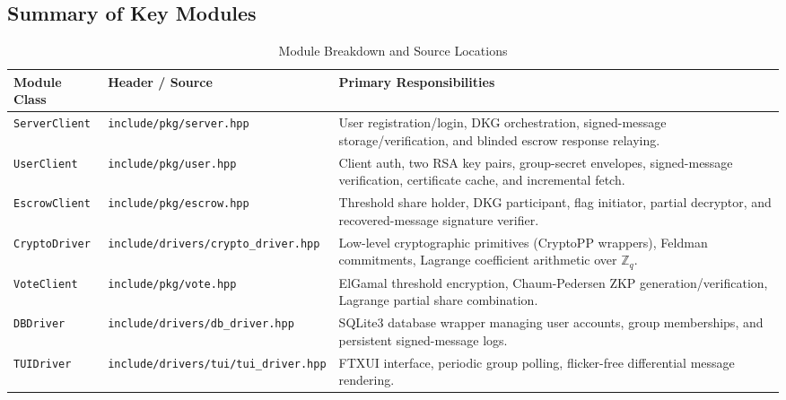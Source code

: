 \documentclass[11pt,a4paper]{article}
\begin{document}
\subsection{Summary of Key Modules}
\begin{table}[H]
	\centering
	\small
	\renewcommand{\arraystretch}{1.4}
	\begin{tabularx}{\textwidth}{l l X}
		\toprule
		\textbf{Module Class} & \textbf{Header / Source}                     & \textbf{Primary Responsibilities}                                                                                                 \\
		\midrule
		\texttt{ServerClient} & \texttt{include/pkg/server.hpp}              & User registration/login, DKG orchestration, signed-message storage/verification, and blinded escrow response relaying.            \\ \hline
		\texttt{UserClient}   & \texttt{include/pkg/user.hpp}                & Client auth, two RSA key pairs, group-secret envelopes, signed-message verification, certificate cache, and incremental fetch.   \\ \hline
		\texttt{EscrowClient} & \texttt{include/pkg/escrow.hpp}              & Threshold share holder, DKG participant, flag initiator, partial decryptor, and recovered-message signature verifier.             \\ \hline
		\texttt{CryptoDriver} & \texttt{include/drivers/crypto\_driver.hpp}  & Low-level cryptographic primitives (CryptoPP wrappers), Feldman commitments, Lagrange coefficient arithmetic over $\mathbb{Z}_q$. \\ \hline
		\texttt{VoteClient}   & \texttt{include/pkg/vote.hpp}                & ElGamal threshold encryption, Chaum-Pedersen ZKP generation/verification, Lagrange partial share combination.                     \\ \hline
		\texttt{DBDriver}     & \texttt{include/drivers/db\_driver.hpp}      & SQLite3 database wrapper managing user accounts, group memberships, and persistent signed-message logs.                           \\ \hline
		\texttt{TUIDriver}    & \texttt{include/drivers/tui/tui\_driver.hpp} & FTXUI interface, periodic group polling, flicker-free differential message rendering.                                             \\
		\bottomrule
	\end{tabularx}
	\caption{Module Breakdown and Source Locations}
	\label{tab:modules}
\end{table}
\end{document}
